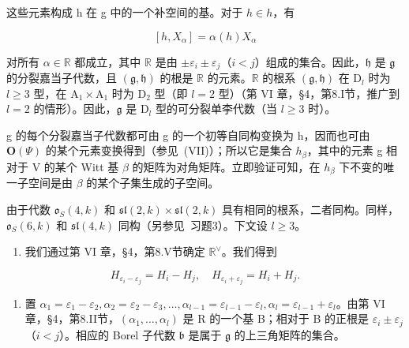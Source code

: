 这些元素构成 h 在 g 中的一个补空间的基。对于 \(h \in h\)，有

\[
[ h, X _ {\alpha} ] = \alpha (h) X _ {\alpha}
\]

对所有 \(\alpha \in \mathbb{R}\) 都成立，其中 \(\mathbb{R}\) 是由 \(\pm \varepsilon_i \pm \varepsilon_j\)（\(i < j\)）组成的集合。因此，\(\mathfrak{h}\) 是 \(\mathfrak{g}\) 的分裂嘉当子代数，且 \((\mathfrak{g}, \mathfrak{h})\) 的根是 \(\mathbb{R}\) 的元素。\(\mathbb{R}\) 的根系 \((\mathfrak{g}, \mathfrak{h})\) 在 \(\mathrm{D}_l\) 时为 \(l \geq 3\) 型，在 \(\mathrm{A}_1 \times \mathrm{A}_1\) 时为 \(\mathrm{D}_2\) 型（即 \(l = 2\) 型）（第 VI 章，§4，第8.I节，推广到 \(l = 2\) 的情形）。因此，\(\mathfrak{g}\) 是 \(\mathrm{D}_l\) 型的可分裂单李代数（当 \(l \geq 3\) 时）。

g 的每个分裂嘉当子代数都可由 g 的一个初等自同构变换为 h，因而也可由 \(\mathbf{O}(\varPsi)\) 的某个元素变换得到（参见~(VII)）；所以它是集合 \(h_{\beta}\)，其中的元素 g 相对于 V 的某个 Witt 基 \(\beta\) 的矩阵为对角矩阵。立即验证可知，在 \(h_{\beta}\) 下不变的唯一子空间是由 \(\beta\) 的某个子集生成的子空间。

由于代数 \(\mathfrak{o}_{S}(4,k)\) 和 \(\mathfrak{sl}(2,k)\times\mathfrak{sl}(2,k)\) 具有相同的根系，二者同构。同样，\(\mathfrak{o}_{S}(6,k)\) 和 \(\mathfrak{sl}(4,k)\) 同构（另参见~习题3）。下文设 \(l\geq3\)。

\begin{enumerate}
\def\labelenumi{(\Roman{enumi})}
\setcounter{enumi}{1}
\tightlist
\item
我们通过第 VI 章，§4，第8.V节确定 \(\mathbb{R}^{\vee}\)。我们得到
\end{enumerate}

\[
H _ {\varepsilon_ {i} - \varepsilon_ {j}} = H _ {i} - H _ {j}, \quad H _ {\varepsilon_ {i} + \varepsilon_ {j}} = H _ {i} + H _ {j}.
\]

\begin{enumerate}
\def\labelenumi{(\Roman{enumi})}
\setcounter{enumi}{2}
\tightlist
\item
置 \(\alpha_{1} = \varepsilon_{1} - \varepsilon_{2},\alpha_{2} = \varepsilon_{2} - \varepsilon_{3},\ldots ,\alpha_{l - 1} = \varepsilon_{l - 1} - \varepsilon_{l},\alpha_{l} = \varepsilon_{l - 1} + \varepsilon_{l}\)。由第 VI 章，§4，第8.II节，\((\alpha_{1},\dots,\alpha_{l})\) 是 R 的一个基 B；相对于 B 的正根是 \(\varepsilon_i\pm \varepsilon_j\)（\(i < j\)）。相应的 Borel 子代数 \(\mathfrak{b}\) 是属于 \(\mathfrak{g}\) 的上三角矩阵的集合。
\end{enumerate}

